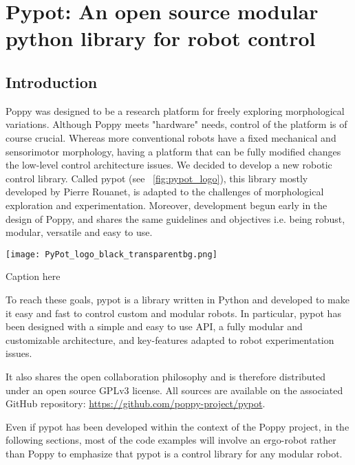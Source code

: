 
\cleartoleftpage

\chapter{Pypot: An open source modular python library for robot control} %

\section{Introduction} %

Poppy was designed to be a research platform for freely exploring morphological variations. Although Poppy meets "hardware" needs, control of the platform is of course crucial. Whereas more conventional robots have a fixed mechanical and sensorimotor morphology, having a platform that can be fully modified changes the low-level control architecture issues.
We decided to develop a new robotic control library. Called pypot (see \figurename~\ref{fig:pypot_logo}), this library mostly developed by Pierre Rouanet, is adapted to the challenges of morphological exploration and experimentation. Moreover, development begun early in the design of Poppy, and shares the same guidelines and objectives i.e. being robust, modular, versatile and easy to use.


\begin{NFfigure}
    \centering
        \texttt{[image: PyPot\_logo\_black\_transparentbg.png]}
    \caption{Caption here}
    \label{fig:figure1}
\end{NFfigure}

To reach these goals, pypot is a library written in Python and developed to make it easy and fast to control custom and modular robots. In particular, pypot has been designed with a simple and easy to use API, a fully modular and customizable architecture, and key-features adapted to robot experimentation issues.

It also shares the open collaboration philosophy and is therefore distributed under an open source GPLv3 license. All sources are available on the associated GitHub repository: \url{https://github.com/poppy-project/pypot}.

Even if pypot has been developed within the context of the Poppy project, in the following sections, most of the code examples will involve an ergo-robot rather than Poppy to emphasize that pypot is a control library for any modular robot.



